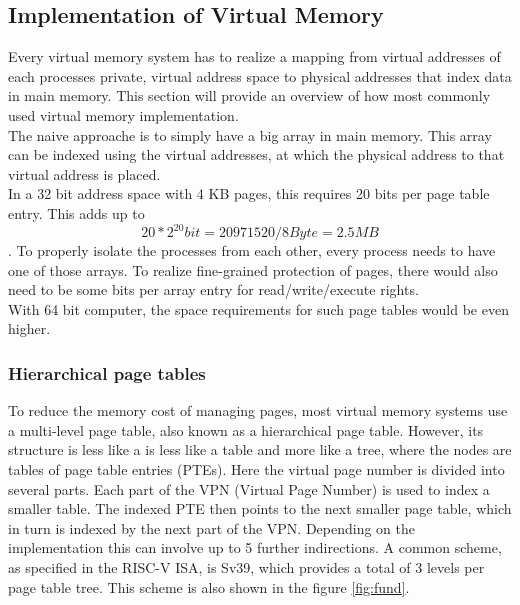 \subsection{Implementation of Virtual Memory}
Every virtual memory system has to realize a mapping from virtual addresses of each processes
private, virtual address space to physical addresses that index data in main memory.
This section will provide an overview of how most commonly used virtual memory implementation.\\

The naive approache is to simply have a big array in main memory. This array can be indexed
using the virtual addresses, at which the physical address to that virtual address is placed.\\
In a 32 bit address space with 4 KB pages, this requires 20 bits per page table entry. This
adds up to \[ 20 * 2^{20} bit = 20971520 / 8 Byte = 2.5 MB \].
To properly isolate the processes from each other, every process needs to have one of those arrays.
To realize fine-grained protection of pages, there would also need to be some bits per array entry
for read/write/execute rights.\\
With 64 bit computer, the space requirements for such page tables would be even higher.

\subsubsection{Hierarchical page tables} 
To reduce the memory cost of managing pages, most  virtual memory systems use a
multi-level page table, also known as a hierarchical page table. However, its structure is less like a
is less like a table and more like a tree, where the nodes are tables of page table entries (PTEs).
Here the virtual page number is divided into several parts. Each part of the VPN (Virtual Page Number)
is used to index a smaller table. The indexed PTE then points to the next smaller page table,
which in turn is indexed by the next part of the VPN. Depending on the implementation
this can involve up to 5 further indirections. A common scheme, as specified in the RISC-V ISA,
is Sv39, which provides a total of 3 levels per page table tree\cite{riscvreader}.
This scheme is also shown in the figure \ref{fig:fund}.

